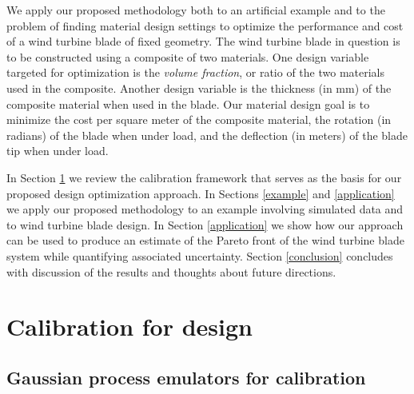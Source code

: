 \documentclass[12pt]{article}
\begin{document}
We apply our proposed methodology both to an artificial example and to the problem of finding material design settings to optimize the performance and cost of a wind turbine blade of fixed geometry.
%
The wind turbine blade in question is to be constructed using a composite of two materials.
%
One design variable targeted for optimization is the \emph{volume fraction}, or ratio of the two materials used in the composite.
%
Another design variable is the thickness (in mm) of the composite material when used in the blade.
%
Our material design goal is to minimize the cost per square meter of the composite material, the rotation (in radians) of the blade when under load, and the deflection (in meters) of the blade tip when under load.

In Section \ref{calib_for_design} we review the calibration framework that serves as the basis for our proposed design optimization approach. 
%
In Sections \ref{example} and \ref{application} we apply our proposed methodology to an example involving simulated data and to wind turbine blade design.
%
In Section \ref{application} we show how our approach can be used to produce an estimate of the Pareto front of the wind turbine blade system while quantifying associated uncertainty.
%
Section \ref{conclusion} concludes with discussion of the results and thoughts about future directions.

\section{Calibration for design}\label{calib_for_design}

\subsection{Gaussian process emulators for calibration}
\end{document}
